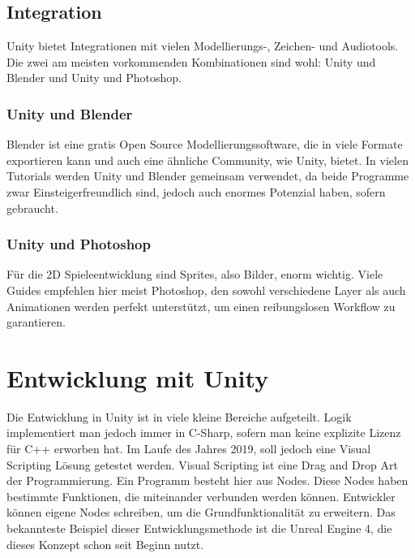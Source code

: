 \subsection{Integration}
Unity bietet Integrationen mit vielen Modellierungs-, Zeichen- und Audiotools. Die zwei am meisten vorkommenden Kombinationen sind wohl: Unity und Blender und Unity und Photoshop.
\subsubsection{Unity und Blender} \label{sec:unity-blender}
Blender ist eine gratis Open Source Modellierungssoftware, die in viele Formate exportieren kann und auch eine ähnliche Community, wie Unity, bietet. In vielen Tutorials werden Unity und Blender gemeinsam verwendet, da beide Programme zwar Einsteigerfreundlich sind, jedoch auch enormes Potenzial haben, sofern gebraucht. 
\subsubsection{Unity und Photoshop}
Für die 2D Spieleentwicklung sind Sprites, also Bilder, enorm wichtig. Viele Guides empfehlen hier meist Photoshop, den sowohl verschiedene Layer als auch Animationen werden perfekt unterstützt, um einen reibungslosen Workflow zu garantieren.

\section{Entwicklung mit Unity}
Die Entwicklung in Unity ist in viele kleine Bereiche aufgeteilt. Logik implementiert man jedoch immer in C-Sharp, sofern man keine explizite Lizenz für C++ erworben hat. Im Laufe des Jahres 2019, soll jedoch eine Visual Scripting Lösung getestet werden. Visual Scripting ist eine Drag and Drop Art der Programmierung. Ein Programm besteht hier aus Nodes. Diese Nodes haben bestimmte Funktionen, die miteinander verbunden werden können. Entwickler können eigene Nodes schreiben, um die Grundfunktionalität zu erweitern. Das bekannteste Beispiel dieser Entwicklungsmethode ist die Unreal Engine 4, die dieses Konzept schon seit Beginn nutzt. 
